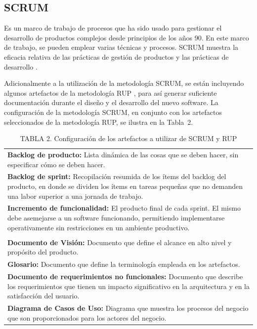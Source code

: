 \documentclass[conference]{IEEEtran}
\begin{document}
	\subsection{SCRUM}
		Es un marco de trabajo de procesos que ha sido usado para gestionar el desarrollo de productos complejos desde principios de los a\~{n}os 90. En este marco de trabajo, se pueden emplear varias t\'{e}cnicas y procesos. SCRUM muestra la eficacia relativa de las pr\'{a}cticas de gesti\'{o}n de productos y las pr\'{a}cticas de desarrollo \cite{Schwaber&Sutherland}.

		Adicionalmente a la utilizaci\'{o}n de la metodolog\'{i}a SCRUM, se est\'{a}n incluyendo algunos artefactos de la metodolog\'{i}a RUP \cite{Kroll&Kruchten}, para as\'{i} generar suficiente documentaci\'{o}n durante el dise\~{n}o y el desarrollo del nuevo software. La configuraci\'{o}n de la metodolog\'{i}a SCRUM, en conjunto con los artefactos seleccionados de la metodolog\'{i}a RUP, se ilustra en la \mbox{Tabla 2}.
		
		\FloatBarrier %
		\vfill
		\begin{table}[htb]
			\caption{TABLA 2. Configuraci\'{o}n de los artefactos a utilizar de SCRUM y RUP}
			\label{tabla_2}
			\centering
			\setlength{\extrarowheight}{2.5pt}
			\begin{tabulary}{8.8cm}{|J|}
				\hline
				\\ \hline
				\textbf{Backlog de producto: }Lista din\'{a}mica de las cosas que se deben hacer, sin especificar c\'{o}mo se deben hacer.\\ \hline
				\textbf{Backlog de sprint: }Recopilaci\'{o}n resumida de los \'{i}tems del backlog del producto, en donde se dividen los \'{i}tems en tareas peque\~{n}as que no demanden una labor superior a una jornada de trabajo.\\ \hline
				\textbf{Incremento de funcionalidad: }El producto final de cada sprint. El mismo debe asemejarse a un software funcionando, permitiendo implementarse operativamente sin restricciones en un ambiente productivo.\\ \hline
				\\ \hline
				\textbf{Documento de Visi\'{o}n: }Documento que define el alcance en alto nivel y prop\'{o}sito del producto.\\
\hline
				\textbf{Glosario: }Documento que define la terminolog\'{i}a empleada en los artefactos.\\ \hline
				\textbf{Documento de requerimientos no funcionales: }Documento que describe los requerimientos que tienen un impacto significativo en la arquitectura y en la satisfacci\'{o}n del usuario.\\ \hline
		\textbf{Diagrama de Casos de Uso: }Diagrama que muestra los procesos del negocio que son proporcionados para los actores del negocio.\\ \hline
			\end{tabulary}
		\end{table}
		\vfill
		\FloatBarrier %
\end{document}
